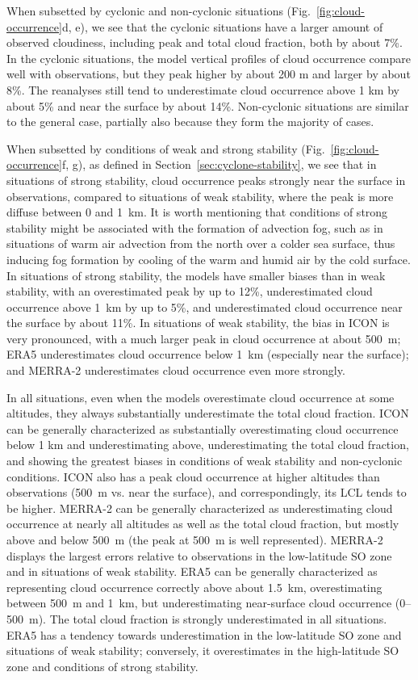 \documentclass[draft]{agujournal2019}
\begin{document}
When subsetted by cyclonic and non-cyclonic situations (Fig.~\ref{fig:cloud-occurrence}d, e), we see that the cyclonic situations have a larger amount of observed cloudiness, including peak and total cloud fraction, both by about 7\%. In the cyclonic situations, the model vertical profiles of cloud occurrence compare well with observations, but they peak higher by about 200 m and larger by about 8\%. The reanalyses still tend to underestimate cloud occurrence above 1 km by about 5\% and near the surface by about 14\%. Non-cyclonic situations are similar to the general case, partially also because they form the majority of cases.

When subsetted by conditions of weak and strong stability (Fig.~\ref{fig:cloud-occurrence}f, g), as defined in Section~\ref{sec:cyclone-stability}, we see that in situations of strong stability, cloud occurrence peaks strongly near the surface in observations, compared to situations of weak stability, where the peak is more diffuse between 0 and 1~km. It is worth mentioning that conditions of strong stability might be associated with the formation of advection fog, such as in situations of warm air advection from the north over a colder sea surface, thus inducing fog formation by cooling of the warm and humid air by the cold surface. In situations of strong stability, the models have smaller biases than in weak stability, with an overestimated peak by up to 12\%, underestimated cloud occurrence above 1~km by up to 5\%, and underestimated cloud occurrence near the surface by about 11\%. In situations of weak stability, the bias in ICON is very pronounced, with a much larger peak in cloud occurrence at about 500~m; ERA5 underestimates cloud occurrence below 1~km (especially near the surface); and MERRA-2 underestimates cloud occurrence even more strongly.

In all situations, even when the models overestimate cloud occurrence at some altitudes, they always substantially underestimate the total cloud fraction. ICON can be generally characterized as substantially overestimating cloud occurrence below 1 km and underestimating above, underestimating the total cloud fraction, and showing the greatest biases in conditions of weak stability and non-cyclonic conditions. ICON also has a peak cloud occurrence at higher altitudes than observations (500~m vs. near the surface), and correspondingly, its LCL tends to be higher. MERRA-2 can be generally characterized as underestimating cloud occurrence at nearly all altitudes as well as the total cloud fraction, but mostly above and below 500~m (the peak at 500~m is well represented). MERRA-2 displays the largest errors relative to observations in the low-latitude SO zone and in situations of weak stability. ERA5 can be generally characterized as representing cloud occurrence correctly above about 1.5~km, overestimating between 500~m and 1~km, but underestimating near-surface cloud occurrence (0--500~m). The total cloud fraction is strongly underestimated in all situations. ERA5 has a tendency towards underestimation in the low-latitude SO zone and situations of weak stability; conversely, it overestimates in the high-latitude SO zone and conditions of strong stability.
\end{document}
